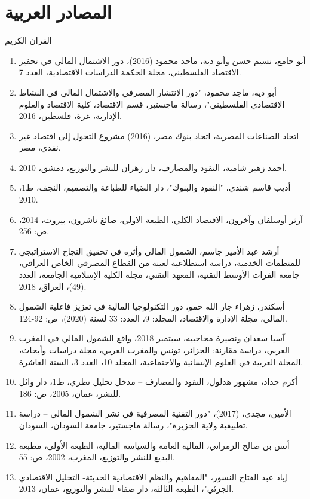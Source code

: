 \documentclass[10pt,a4paper]{report}
\begin{document}
	\section*{المصادر العربية}
القران الكريم
\begin{enumerate}
	\item أبو جامع، نسيم حسن وأبو دية، ماجد محمود (2016)، دور الاشتمال المالي في تحفيز الاقتصاد الفلسطيني، مجلة الحكمة الدراسات الاقتصادية، العدد 7.
	\item أبو ديه، ماجد محمود، "دور الانتشار المصرفي والاشتمال المالي في النشاط الاقتصادي الفلسطيني"، رسالة ماجستير، قسم الاقتصاد، كلية الاقتصاد والعلوم الإدارية، غزة، فلسطين، 2016.
	\item اتحاد الصناعات المصرية، اتحاد بنوك مصر، (2016) مشروع التحول إلى اقتصاد غير نقدي، مصر.
	\item أحمد زهير شامية، النقود والمصارف، دار زهران للنشر والتوزيع، دمشق، 2010.
	\item أديب قاسم شندي، "النقود والبنوك"، دار الضياء للطباعة والتصميم، النجف، ط1، 2010.
	\item آرثر أوسلفان وآخرون، الاقتصاد الكلي، الطبعة الأولى، صائغ ناشرون، بيروت، 2014، ص: 256.
	\item أرشد عبد الأمير جاسم، الشمول المالي وأثره في تحقيق النجاح الاستراتيجي للمنظمات الخدمية، دراسة استطلاعية لعينة من القطاع المصرفي الخاص العراقي، جامعة الفرات الأوسط التقنية، المعهد التقني، مجلة الكلية الإسلامية الجامعة، العدد (49)، العراق، 2018.
	\item أسكندر، زهراء جار الله حمو، دور التكنولوجيا المالية في تعزيز فاعلية الشمول المالي، مجلة الإدارة والاقتصاد، المجلد: 9، العدد: 33 لسنة (2020)، ص: 92-124.
	\item آسيا سعدان ونصيرة محاجبيه، سبتمبر 2018، واقع الشمول المالي في المغرب العربي، دراسة مقارنة: الجزائر، تونس والمغرب العربي، مجلة دراسات وأبحاث، المجلة العربية في العلوم الإنسانية والاجتماعية، المجلد 10، العدد 3، السنة العاشرة.
	\item أكرم حداد، مشهور هدلول، النقود والمصارف – مدخل تحليل نظري، ط1، دار وائل للنشر، عمان، 2005، ص: 186.
	\item الأمين، مجدي، (2017)، "دور التقنية المصرفية في نشر الشمول المالي – دراسة تطبيقية ولاية الجزيرة"، رسالة ماجستير، جامعة السودان، السودان.
	\item أنس بن صالح الزمراني، المالية العامة والسياسة المالية، الطبعة الأولى، مطبعة البديع للنشر والتوزيع، المغرب، 2002، ص: 55.
	\item إياد عبد الفتاح النسور، "المفاهيم والنظم الاقتصادية الحديثة- التحليل الاقتصادي الجزئي"، الطبعة الثالثة، دار صفاء للنشر والتوزيع، عمان، 2013.

\end{enumerate}
\end{document}
